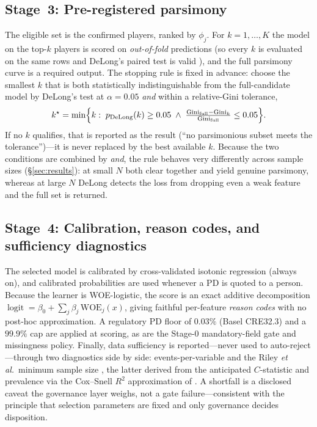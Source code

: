\documentclass[9pt,journal]{IEEEtai}
\begin{document}
\subsection{Stage~3: Pre-registered parsimony}
The eligible set is the confirmed players, ranked by $\phi_j$. For $k=1,\dots,K$ the model on
the top-$k$ players is scored on \emph{out-of-fold} predictions (so every $k$ is evaluated on
the same rows and DeLong's paired test is valid \cite{delong1988}), and the full parsimony
curve is a required output. The stopping rule is fixed in advance: choose the smallest $k$ that
is both statistically indistinguishable from the full-candidate model by DeLong's test at
$\alpha=0.05$ \emph{and} within a relative-Gini tolerance,
\begin{equation}
k^\star=\min\Bigl\{k:\; p_{\text{DeLong}}(k)\ge0.05 \;\wedge\;
\tfrac{\mathrm{Gini}_{\text{full}}-\mathrm{Gini}_k}{\mathrm{Gini}_{\text{full}}}\le 0.05\Bigr\}.
\label{eq:stop}
\end{equation}
If no $k$ qualifies, that is reported as the result (``no parsimonious subset meets the
tolerance'')---it is never replaced by the best available $k$. Because the two conditions are
combined by \emph{and}, the rule behaves very differently across sample sizes (\S\ref{sec:results}):
at small $N$ both clear together and yield genuine parsimony, whereas at large $N$ DeLong detects
the loss from dropping even a weak feature and the full set is returned.

\subsection{Stage~4: Calibration, reason codes, and sufficiency diagnostics}
The selected model is calibrated by cross-validated isotonic regression \cite{zadrozny2002,niculescu2005} (always on), and
calibrated probabilities are used whenever a PD is quoted to a person. Because the learner is
WOE-logistic, the score is an exact additive decomposition
$\operatorname{logit}=\beta_0+\sum_j\beta_j\,\mathrm{WOE}_j(x)$, giving faithful per-feature
\emph{reason codes} with no post-hoc approximation. A regulatory PD floor of $0.03\%$ (Basel
CRE32.3) and a $99.9\%$ cap are applied at scoring, as are the Stage-0 mandatory-field gate and
missingness policy. Finally, data sufficiency is reported---never used to auto-reject---through
two diagnostics side by side: events-per-variable \cite{peduzzi1996,vansmeden2019} and the
Riley \emph{et al.}\ minimum sample size \cite{riley2020bmj,riley2019sim}, the latter derived
from the anticipated $C$-statistic and prevalence via the Cox--Snell $R^2$ approximation of
\cite{rileyvancalster2020}. A shortfall is a disclosed caveat the governance layer weighs, not
a gate failure---consistent with the principle that selection parameters are fixed and only
governance decides disposition.
\end{document}
